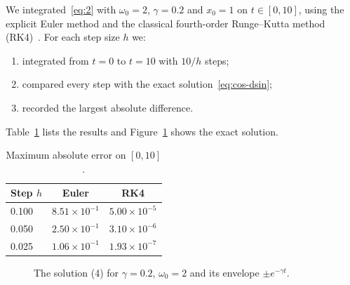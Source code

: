 \documentclass[11pt,a4paper]{article}
\begin{document}
We integrated~\eqref{eq:2} with $\omega_{0}=2$, $\gamma=0.2$ and $x_{0}=1$ on $t\in[0,10]$, using the explicit Euler method and the classical fourth-order Runge--Kutta method (RK4)~\cite{hairer}. For each step size $h$ we:
\begin{enumerate}
  \item integrated from $t=0$ to $t=10$ with $10/h$ steps;
  \item compared every step with the exact solution~\eqref{eq:cos-dsin};
  \item recorded the largest absolute difference.
\end{enumerate}
Table~\ref{tab:maximum-absolute} lists the results and Figure~\ref{fig:the-solution} shows the exact solution.

\begin{table}[htbp]
  \centering
  \caption{Maximum absolute error on $[0,10]$.}
  \label{tab:maximum-absolute}
  \begin{tabular}{lcc}
    \toprule
    \textbf{Step $h$} & \textbf{Euler} & \textbf{RK4} \\
    \midrule
    0.100 & $8.51\times10^{-1}$ & $5.00\times10^{-5}$ \\
    0.050 & $2.50\times10^{-1}$ & $3.10\times10^{-6}$ \\
    0.025 & $1.06\times10^{-1}$ & $1.93\times10^{-7}$ \\
    \bottomrule
  \end{tabular}
\end{table}

\begin{figure}[htbp]
  \centering
  \caption{The solution (4) for $\gamma=0.2$, $\omega_{0}=2$ and its envelope $\pm e^{-\gamma t}$.}
  \label{fig:the-solution}
\end{figure}
\end{document}
